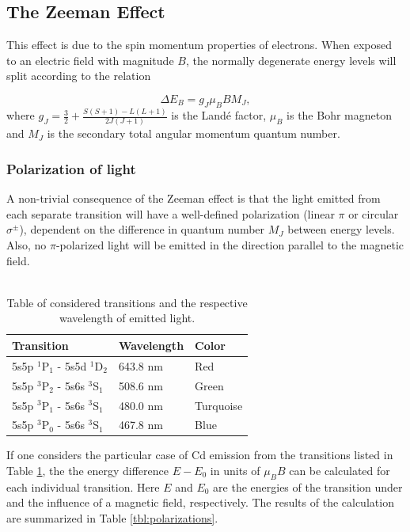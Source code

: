 \documentclass[12pt]{article}
\begin{document}
\subsection{The Zeeman Effect}
This effect is due to the spin momentum properties of electrons. When exposed to an electric field with magnitude $B$, the normally degenerate energy levels will split according to the relation 

\begin{equation} \label{eq:zeeman}
\Delta E_B = g_J \mu_B B M_J,    
\end{equation}
\noindent
where $g_J = \frac{3}{2} + \frac{S(S+1) - L(L+1)}{2J(J+1)}$ is the Landé factor, $\mu_B$ is the Bohr magneton and $M_J$ is the secondary total angular momentum quantum number.



\subsubsection{Polarization of light}
A non-trivial consequence of the Zeeman effect is that the light emitted from each separate transition will have a well-defined polarization (linear $\pi$ or circular $\sigma^{\pm}$), dependent on the difference in quantum number $M_J$ between energy levels. Also, no $\pi$-polarized light will be emitted in the direction parallel to the magnetic field. \\\\
\noindent

\begin{table}[h!]
\centering
\begin{tabular}{l|l|l}
Transition                      & Wavelength & Color     \\ \hline
5s5p $^1$P$_1$ - 5s5d $^1$D$_2$ & 643.8 nm   & Red       \\
5s5p $^3$P$_2$ - 5s6s $^3$S$_1$ & 508.6 nm   & Green     \\
5s5p $^3$P$_1$ - 5s6s $^3$S$_1$ & 480.0 nm   & Turquoise \\
5s5p $^3$P$_0$ - 5s6s $^3$S$_1$ & 467.8 nm   & Blue     
\end{tabular}
\caption{Table of considered transitions and the respective wavelength of emitted light.\cite{manual}}
\label{tbl:transitions}
\end{table}

If one considers the particular case of Cd emission from the transitions listed in Table \ref{tbl:transitions}, the the energy difference $E - E_0$ in units of $\mu_B B$ can be calculated for each individual transition. Here $E$ and $E_0$ are the energies of the transition under and the influence of a magnetic field, respectively. The results of the calculation are summarized in Table \ref{tbl:polarizations}.
\end{document}

